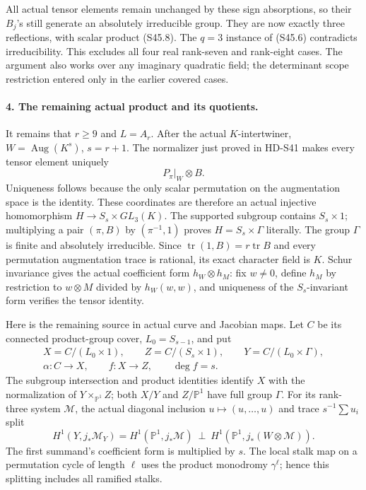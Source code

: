 All actual tensor elements remain unchanged by these sign
absorptions, so their \(B_j\)'s still generate an absolutely
irreducible group. They are now exactly three reflections,
with scalar product (S45.8). The \(q=3\) instance of
(S45.6) contradicts irreducibility. This excludes all four
real rank-seven and rank-eight cases. The argument also
works over any imaginary quadratic field; the determinant
scope restriction entered only in the earlier covered cases.

\paragraph{4. The remaining actual product and its quotients.}
It remains that \(r\ge9\) and \(L=A_r\).
After the actual \(K\)-intertwiner,
\(W=\operatorname{Aug}(K^s)\), \(s=r+1\).
The normalizer just proved in HD-S41 makes every tensor
element uniquely
\[
                         P_\pi|_W\otimes B.
 \tag{S45.9}
\]
Uniqueness follows because the only scalar permutation on
the augmentation space is the identity. These coordinates
are therefore an actual injective homomorphism
\(H\to S_s\times GL_3(K)\). The supported subgroup
contains \(S_s\times1\); multiplying a pair \((\pi,B)\)
by \((\pi^{-1},1)\) proves \(H=S_s\times\Gamma\)
literally. The group \(\Gamma\) is finite and absolutely
irreducible. Since \(\operatorname{tr}(1,B)=r\operatorname{tr}B\)
and every permutation augmentation trace is rational, its
exact character field is \(K\). Schur invariance gives
the actual coefficient form \(h_W\otimes h_M\):
fix \(w\ne0\), define \(h_M\) by restriction to
\(w\otimes M\) divided by \(h_W(w,w)\), and uniqueness
of the \(S_s\)-invariant form verifies the tensor identity.

Here is the remaining source in actual curve and Jacobian
maps. Let \(C\) be its connected product-group cover,
\(L_0=S_{s-1}\), and put
\[
 \begin{gathered}
 X=C/(L_0\times1),\qquad Z=C/(S_s\times1),\qquad
 Y=C/(L_0\times\Gamma),\\
 \alpha:C\longrightarrow X,\qquad f:X\longrightarrow Z,
                         \qquad\deg f=s.                   \tag{S45.10}
 \end{gathered}
\]
The subgroup intersection and product identities identify
\(X\) with the normalization of \(Y\times_{\mathbb P^1}Z\);
both \(X/Y\) and \(Z/\mathbb P^1\) have full group \(\Gamma\).
For its rank-three system \(\mathcal M\), the actual
diagonal inclusion \(u\mapsto(u,\ldots,u)\) and trace
\(s^{-1}\sum u_i\) split
\[
 H^1(Y,j_*\mathcal M_Y)=
 H^1(\mathbb P^1,j_*\mathcal M)\ \perp\
 H^1(\mathbb P^1,j_*(W\otimes\mathcal M)).
                                                               \tag{S45.11}
\]
The first summand's coefficient form is multiplied by \(s\).
The local stalk map on a permutation cycle of length \(\ell\)
uses the product monodromy \(\gamma^\ell\); hence this
splitting includes all ramified stalks.

